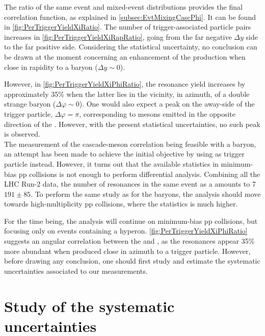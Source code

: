 The ratio of the same event and mixed-event distributions provides the final correlation function, as explained in \Sec\ref{subsec:EvtMixingCascPhi}. It can be found in \figs\ref{fig:PerTriggerYieldXiRatio}. The number of trigger-associated particle pairs increases in \fig\ref{fig:PerTriggerYieldXiRapRatio}, going from the far negative $\Delta y$ side to the far positive side. Considering the statistical uncertainty, no conclusion can be drawn at the moment concerning an enhancement of the \rmPhiMes production when close in rapidity to a \rmXiPM baryon ($\Delta y \sim 0$).

However, in \fig\ref{fig:PerTriggerYieldXiPhiRatio}, the \rmPhiMes resonance yield increases by approximately 35\% when the latter lies in the vicinity, in azimuth, of a double strange baryon ($\Delta \varphi \sim 0$). One would also expect a peak on the away-side of the trigger particle, \ie $\Delta \varphi = \pi$, corresponding to \rmPhiMes mesons emitted in the opposite direction of the \rmXiPM. However, with the present statistical uncertainties, no such peak is observed.\\

The measurement of the cascade-\rmPhiMes meson correlation being feasible with a \rmXiPM baryon, an attempt has been made to achieve the initial objective by using \rmOmegaPM as trigger particle instead. However, it turns out that the available statistics in minimum-bias pp collisions is not enough to perform differential analysis. Combining all the LHC Run-2 data, the number of \rmPhiMes resonances in the same event as a \rmOmegaPM amounts to 7 $191 \pm 85$. To perform the same study as for the \rmXi baryons, the analysis should move towards high-multiplicity pp collisions, where the statistics is much higher.

For the time being, the analysis will continue on minimum-bias pp collisions, but focusing only on events containing a \rmXiPM hyperon. \Fig\ref{fig:PerTriggerYieldXiPhiRatio} suggests an angular correlation between the \rmPhiMes and \rmXiPM, as the resonances appear 35\% more abundant when produced close in azimuth to a trigger particle. However, before drawing any conclusion, one should first study and estimate the systematic uncertainties associated to our measurements.

\section{Study of the systematic uncertainties}
\label{sec:SystStudyCorrelation}

